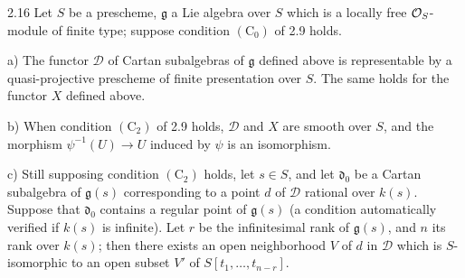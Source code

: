 \begin{theorem}{2.16}\label{XIV.2.16}
Let $S$ be a prescheme, $\mathfrak g$ a Lie algebra over $S$
which is a locally free $\mathcal{O}_S$-module of finite type; suppose
condition $(\mathrm C_0)$ of 2.9 holds.

\noindent a) The functor $\mathscr D$ of Cartan subalgebras of
$\mathfrak g$ defined above is representable by a quasi-projective
prescheme of finite presentation over $S$. The same holds for
the functor $X$ defined above.

\noindent b) When condition $(\mathrm C_2)$ of 2.9 holds,
$\mathscr D$ and $X$ are smooth over $S$, and the morphism
$\psi^{-1}(U)\to U$ induced by $\psi$ is an isomorphism.

\noindent c) Still supposing condition $(\mathrm C_2)$ holds,
let $s\in S$, and let $\mathfrak d_0$ be a Cartan subalgebra
of $\mathfrak g(s)$ corresponding to a point $d$ of
$\mathscr D$ rational over $k(s)$. Suppose that
$\mathfrak d_0$ contains a regular point of $\mathfrak g(s)$
(a condition automatically verified if $k(s)$ is infinite).
Let $r$ be the infinitesimal rank of $\mathfrak g(s)$,
and $n$ its rank over $k(s)$; then there exists an open
neighborhood $V$ of $d$ in $\mathscr D$ which is
$S$-isomorphic to an open subset $V'$ of $S[t_1,\ldots,t_{n-r}]$.
\end{theorem}
